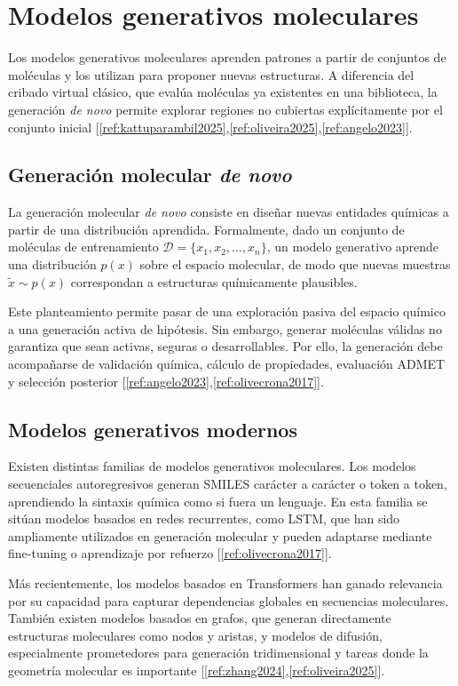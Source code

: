 \documentclass[IB]{TFUOC}%
\begin{document}
\section{Modelos generativos moleculares}

Los modelos generativos moleculares aprenden patrones a partir de conjuntos de moléculas y los utilizan para proponer nuevas estructuras. A diferencia del cribado virtual clásico, que evalúa moléculas ya existentes en una biblioteca, la generación \textit{de novo} permite explorar regiones no cubiertas explícitamente por el conjunto inicial [\ref{ref:kattuparambil2025},\ref{ref:oliveira2025},\ref{ref:angelo2023}].

\subsection{Generación molecular \textit{de novo}}

La generación molecular \textit{de novo} consiste en diseñar nuevas entidades químicas a partir de una distribución aprendida. Formalmente, dado un conjunto de moléculas de entrenamiento $\mathcal{D} = \{x_1, x_2, \dots, x_n\}$, un modelo generativo aprende una distribución $p(x)$ sobre el espacio molecular, de modo que nuevas muestras $\tilde{x} \sim p(x)$ correspondan a estructuras químicamente plausibles.

Este planteamiento permite pasar de una exploración pasiva del espacio químico a una generación activa de hipótesis. Sin embargo, generar moléculas válidas no garantiza que sean activas, seguras o desarrollables. Por ello, la generación debe acompañarse de validación química, cálculo de propiedades, evaluación ADMET y selección posterior [\ref{ref:angelo2023},\ref{ref:olivecrona2017}].

\subsection{Modelos generativos modernos}

Existen distintas familias de modelos generativos moleculares. Los modelos secuenciales autoregresivos generan SMILES carácter a carácter o token a token, aprendiendo la sintaxis química como si fuera un lenguaje. En esta familia se sitúan modelos basados en redes recurrentes, como LSTM, que han sido ampliamente utilizados en generación molecular y pueden adaptarse mediante fine-tuning o aprendizaje por refuerzo [\ref{ref:olivecrona2017}].

Más recientemente, los modelos basados en Transformers han ganado relevancia por su capacidad para capturar dependencias globales en secuencias moleculares. También existen modelos basados en grafos, que generan directamente estructuras moleculares como nodos y aristas, y modelos de difusión, especialmente prometedores para generación tridimensional y tareas donde la geometría molecular es importante [\ref{ref:zhang2024},\ref{ref:oliveira2025}].
\end{document}
